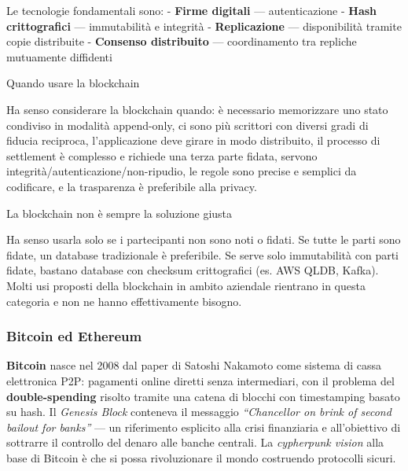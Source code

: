 \documentclass[
  italian,
  openany]{book}
\begin{document}
Le tecnologie fondamentali sono: - \textbf{Firme digitali} ---
autenticazione - \textbf{Hash crittografici} --- immutabilità e
integrità - \textbf{Replicazione} --- disponibilità tramite copie
distribuite - \textbf{Consenso distribuito} --- coordinamento tra
repliche mutuamente diffidenti

\begin{callouttip}{Quando usare la blockchain}

Ha senso considerare la blockchain quando: è necessario memorizzare uno
stato condiviso in modalità append-only, ci sono più scrittori con
diversi gradi di fiducia reciproca, l'applicazione deve girare in modo
distribuito, il processo di settlement è complesso e richiede una terza
parte fidata, servono integrità/autenticazione/non-ripudio, le regole
sono precise e semplici da codificare, e la trasparenza è preferibile
alla privacy.

\end{callouttip}

\begin{calloutwarning}{La blockchain non è sempre la soluzione giusta}

Ha senso usarla solo se i partecipanti non sono noti o fidati. Se tutte
le parti sono fidate, un database tradizionale è preferibile. Se serve
solo immutabilità con parti fidate, bastano database con checksum
crittografici (es. AWS QLDB, Kafka). Molti usi proposti della blockchain
in ambito aziendale rientrano in questa categoria e non ne hanno
effettivamente bisogno.

\end{calloutwarning}

\subsubsection{Bitcoin ed Ethereum}\label{bitcoin-ed-ethereum}

\textbf{Bitcoin} nasce nel 2008 dal paper di Satoshi Nakamoto come
sistema di cassa elettronica P2P: pagamenti online diretti senza
intermediari, con il problema del \textbf{double-spending} risolto
tramite una catena di blocchi con timestamping basato su hash. Il
\emph{Genesis Block} conteneva il messaggio \emph{``Chancellor on brink
of second bailout for banks''} --- un riferimento esplicito alla crisi
finanziaria e all'obiettivo di sottrarre il controllo del denaro alle
banche centrali. La \emph{cypherpunk vision} alla base di Bitcoin è che
si possa rivoluzionare il mondo costruendo protocolli sicuri.
\end{document}
